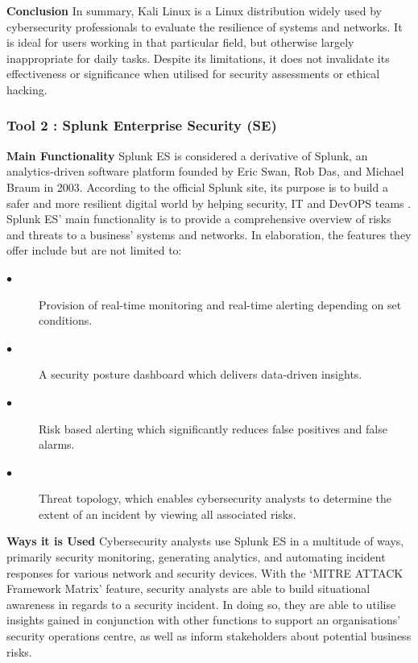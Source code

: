 \documentclass[a4paper, 11pt]{report}
\begin{document}
\textbf{Conclusion}
\newline In summary, Kali Linux is a Linux distribution widely used by cybersecurity professionals to evaluate the resilience of systems and networks. It is ideal for users working in that particular field, but otherwise largely inappropriate for daily tasks. Despite its limitations, it does not invalidate its effectiveness or significance when utilised for security assessments or ethical hacking. 

\subsubsection{Tool 2 : Splunk Enterprise Security (SE)}
\textbf{Main Functionality} 
\newline Splunk ES is considered a derivative of Splunk, an analytics-driven software platform founded by Eric Swan, Rob Das, and Michael Braum in 2003. According to the official Splunk site, its purpose is to build a safer and more resilient digital world by helping security, IT and DevOPS teams \cite{splunk}.  Splunk ES’ main functionality is to provide a comprehensive overview of risks and threats to a business’ systems and networks. In elaboration, the features they offer include but are not limited to:

\begin{description}
\item[$\bullet$] Provision of real-time monitoring and real-time alerting depending on set conditions.
\item[$\bullet$] A security posture dashboard which delivers data-driven insights.
\item[$\bullet$] Risk based alerting which significantly reduces false positives and false alarms.
\item[$\bullet$] Threat topology, which enables cybersecurity analysts to determine the extent of an incident by viewing all associated risks.
\end{description}

\textbf{Ways it is Used} 
\newline Cybersecurity analysts use Splunk ES in a multitude of ways, primarily security monitoring, generating analytics, and automating incident responses for various network and security devices. With the ‘MITRE ATTACK Framework Matrix’ feature, security analysts are able to build situational awareness in regards to a security incident. In doing so, they are able to utilise insights gained in conjunction with other functions to support an organisations’ security operations centre, as well as inform stakeholders about potential business risks. 
\end{document}
